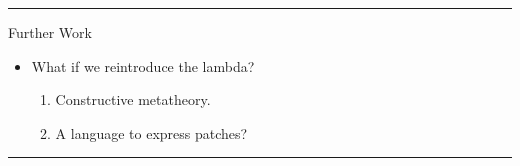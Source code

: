 \documentclass[12pt]{article} \usepackage{beamerarticle} \usepackage{fullpage}
\begin{document}
\hrule
\begin{frame}{Further Work}
  
\begin{itemize}
\item What if we reintroduce the lambda?
\begin{enumerate}
\item Constructive metatheory.
\item A language to express patches?
\end{enumerate}
\end{itemize}
\end{frame}
\hrule
\end{document}
